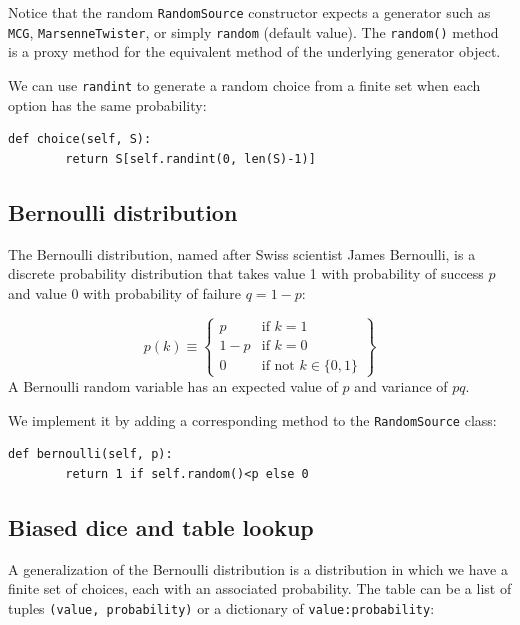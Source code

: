 \documentclass[justified, sixbynine]{tufte-book}
\def\ft{\small\tt}
\theoremstyle{plain}%
\newtheorem * {corollary}{Corollary}
\theoremstyle{definition}
\theoremstyle{remark}
\newtheorem * {remark}{Remark}
\newtheorem * {note}{Note}
\begin{document}
\begin{fullwidth}
Notice that the random {\ft RandomSource} constructor expects a generator such as {\ft MCG}, {\ft MarsenneTwister}, or simply {\ft random} (default value). The {\ft random()} method is a proxy method for the equivalent method of the underlying generator object.

We can use {\ft randint} to generate a random choice from a finite set when each option has the same probability:

\begin{lstlisting}[caption={in file: {\ft nlib.py}}]
    def choice(self, S):
        return S[self.randint(0, len(S)-1)]
\end{lstlisting}

\goodbreak\subsection{Bernoulli distribution}

The Bernoulli distribution, named after Swiss scientist James Bernoulli, is
a discrete probability distribution that takes value 1 with
probability of success $p$ and value 0 with probability of failure $q=1-p$:

\begin{equation}
p(k) \equiv \left\{
\begin{array}{ll}
p & \text{if }k=1 \\
1-p & \text{if }k=0 \\
0 & \text{if not }k \in \{0, 1\}
\end{array}
\right\}
\end{equation}
A Bernoulli random variable has an expected value of $p$ and variance of $pq$.

We implement it by adding a corresponding method to the {\ft RandomSource} class:

\begin{lstlisting}[caption={in file: {\ft nlib.py}}]
    def bernoulli(self, p):
        return 1 if self.random()<p else 0
\end{lstlisting}

\goodbreak\subsection{Biased dice and table lookup}

A generalization of the Bernoulli distribution is a distribution in which we have a finite set of choices, each with an associated probability. The table can be a list of tuples {\ft (value, probability)} or a dictionary of {\ft value:probability}:


\end{fullwidth}
\end{document}
